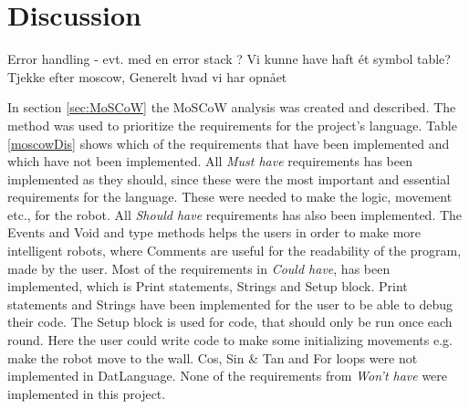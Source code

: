 \chapter{Discussion}
\label{chap:Discussion}

Error handling - evt. med en error stack ?
Vi kunne have haft ét symbol table?
Tjekke efter moscow,
Generelt hvad vi har opnået


In section \ref{sec:MoSCoW} the MoSCoW analysis was created and described. The method was used to prioritize the requirements for the project's language. Table \ref{moscowDis} shows which of the requirements that have been implemented and which have not been implemented. \newline
All \textit{Must have} requirements has been implemented as they should, since these were the most important and essential requirements for the language. These were needed to make the logic, movement etc., for the robot. \newline
All \textit{Should have} requirements has also been implemented. The Events and Void and type methods helps the users in order to make more intelligent robots, where Comments are useful for the readability of the program, made by the user. \newline
Most of the requirements in \textit{Could have}, has been implemented, which is Print statements, Strings and Setup block. Print statements and Strings have been implemented for the user to be able to debug their code. The Setup block is used for code, that should only be run once each round. Here the user could write code to make some initializing movements e.g. make the  robot move to the wall. Cos, Sin \& Tan and For loops were not implemented in DatLanguage. \newline
None of the requirements from \textit{Won't have} were implemented in this project.

